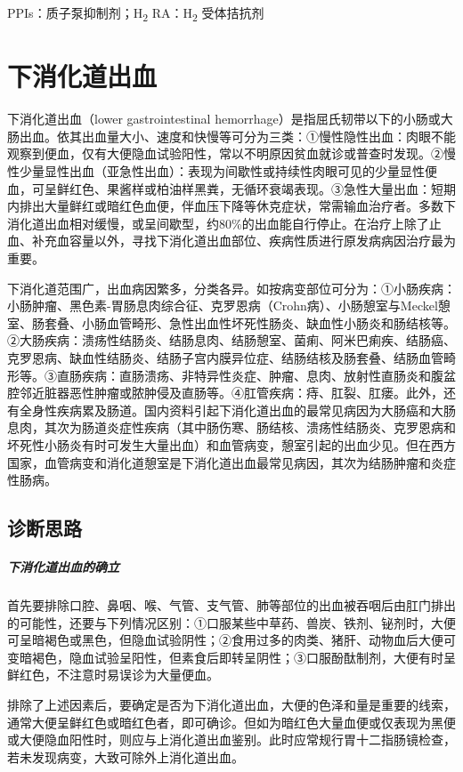 PPIs：质子泵抑制剂；H\textsubscript{2} RA：H\textsubscript{2} 受体拮抗剂

\protect\hypertarget{text00033.html}{}{}

\section{下消化道出血}

下消化道出血（lower gastrointestinal
hemorrhage）是指屈氏韧带以下的小肠或大肠出血。依其出血量大小、速度和快慢等可分为三类：①慢性隐性出血：肉眼不能观察到便血，仅有大便隐血试验阳性，常以不明原因贫血就诊或普查时发现。②慢性少量显性出血（亚急性出血）：表现为间歇性或持续性肉眼可见的少量显性便血，可呈鲜红色、果酱样或柏油样黑粪，无循环衰竭表现。③急性大量出血：短期内排出大量鲜红或暗红色血便，伴血压下降等休克症状，常需输血治疗者。多数下消化道出血相对缓慢，或呈间歇型，约80\%的出血能自行停止。在治疗上除了止血、补充血容量以外，寻找下消化道出血部位、疾病性质进行原发病病因治疗最为重要。

下消化道范围广，出血病因繁多，分类各异。如按病变部位可分为：①小肠疾病：小肠肿瘤、黑色素-胃肠息肉综合征、克罗恩病（Crohn病）、小肠憩室与Meckel憩室、肠套叠、小肠血管畸形、急性出血性坏死性肠炎、缺血性小肠炎和肠结核等。②大肠疾病：溃疡性结肠炎、结肠息肉、结肠憩室、菌痢、阿米巴痢疾、结肠癌、克罗恩病、缺血性结肠炎、结肠子宫内膜异位症、结肠结核及肠套叠、结肠血管畸形等。③直肠疾病：直肠溃疡、非特异性炎症、肿瘤、息肉、放射性直肠炎和腹盆腔邻近脏器恶性肿瘤或脓肿侵及直肠等。④肛管疾病：痔、肛裂、肛瘘。此外，还有全身性疾病累及肠道。国内资料引起下消化道出血的最常见病因为大肠癌和大肠息肉，其次为肠道炎症性疾病（其中肠伤寒、肠结核、溃疡性结肠炎、克罗恩病和坏死性小肠炎有时可发生大量出血）和血管病变，憩室引起的出血少见。但在西方国家，血管病变和消化道憩室是下消化道出血最常见病因，其次为结肠肿瘤和炎症性肠病。

\subsection{诊断思路}

\subparagraph{下消化道出血的确立}

首先要排除口腔、鼻咽、喉、气管、支气管、肺等部位的出血被吞咽后由肛门排出的可能性，还要与下列情况区别：①口服某些中草药、兽炭、铁剂、铋剂时，大便可呈暗褐色或黑色，但隐血试验阴性；②食用过多的肉类、猪肝、动物血后大便可变暗褐色，隐血试验呈阳性，但素食后即转呈阴性；③口服酚酞制剂，大便有时呈鲜红色，不注意时易误诊为大量便血。

排除了上述因素后，要确定是否为下消化道出血，大便的色泽和量是重要的线索，通常大便呈鲜红色或暗红色者，即可确诊。但如为暗红色大量血便或仅表现为黑便或大便隐血阳性时，则应与上消化道出血鉴别。此时应常规行胃十二指肠镜检查，若未发现病变，大致可除外上消化道出血。

